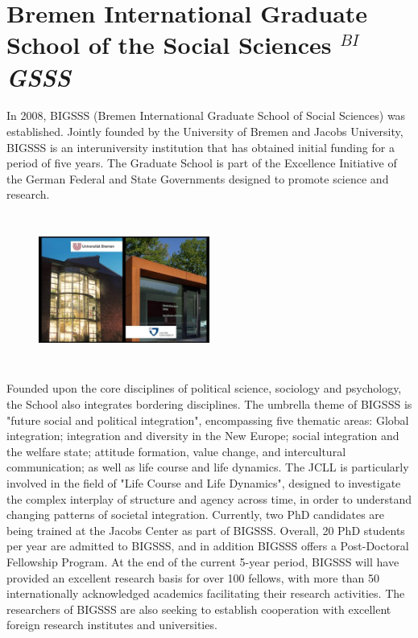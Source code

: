 \section{Bremen International Graduate School of the Social Sciences $^{BI}$\textit{GSSS}} 

\paragraph{}
In 2008, BIGSSS (Bremen International Graduate School of Social Sciences) was established. Jointly founded by the University of Bremen and Jacobs University, BIGSSS is an interuniversity institution that has obtained initial funding for a period of five years. The Graduate School is part of the Excellence Initiative of the German Federal and State Governments designed to promote science and research. 

\begin{figure}[htbp]
	\begin{center}
		\includegraphics[width=0.5\textwidth,height=5cm]{photo.jpg}
	\end{center}
\end{figure}

Founded upon the core disciplines of political science, sociology and psychology, the School also integrates bordering disciplines. The umbrella theme of BIGSSS is "future social and political integration", encompassing five thematic areas: Global integration; integration and diversity in the New Europe; social integration and the welfare state; attitude formation, value change, and intercultural communication; as well as life course and life dynamics. The JCLL is particularly involved in the field of "Life Course and Life Dynamics", designed to investigate the complex interplay of structure and agency across time, in order to understand changing patterns of societal integration. Currently, two PhD candidates are being trained at the Jacobs Center as part of BIGSSS. Overall, 20 PhD students per year are admitted to BIGSSS, and in addition BIGSSS offers a Post-Doctoral Fellowship Program. At the end of the current 5-year period, BIGSSS will have provided an excellent research basis for over 100 fellows, with more than 50 internationally acknowledged academics facilitating their research activities.  The researchers of BIGSSS are also seeking to establish cooperation with excellent foreign research institutes and universities. 
